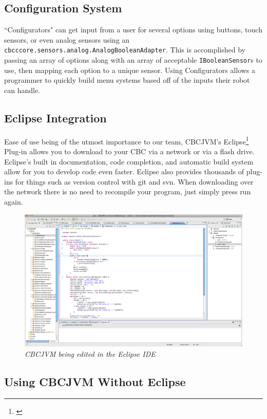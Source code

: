 \documentclass[12pt,letterpaper]{article}
\newcommand{\urlfootnote}[1]{\footnote{\url{#1}}}
\begin{document}
\subsection{Configuration System}

``Configurators" can get input from a user for several options using buttons, touch sensors, or even analog sensors using an \texttt{cbcccore.\-sensors.\-analog.\-AnalogBooleanAdapter}. This is accomplished by passing an array of options along with an array of acceptable \texttt{IBooleanSensor}s to use, then mapping each option to a unique sensor. Using Configurators allows a programmer to quickly build menu systems based off of the inputs their robot can handle.



\subsection{Eclipse Integration}

Ease of use being of the utmost importance to our team, CBCJVM's Eclipse\urlfootnote{} Plug-in allows you to download to your CBC via a network or via a flash drive. Eclipse's built in documentation, code completion, and automatic build system allow for you to develop code even faster. Eclipse also provides thousands of plug-ins for things such as version control with git and svn. When downloading over the network there is no need to recompile your program, just simply press run again.

\begin{figure}[H]
\includegraphics[width=\textwidth]{eclipse.png}
\caption{\textit{CBCJVM being edited in the Eclipse IDE}}
\end{figure}


\subsection{Using CBCJVM Without Eclipse}
\end{document}

